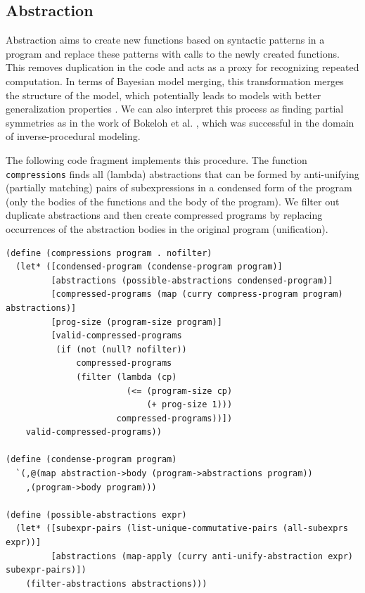 \documentclass[a4paper,10pt]{article}
\begin{document}
\subsection{Abstraction}

Abstraction aims to create new functions based on syntactic patterns in a program and replace these patterns with calls to the newly created functions.
This removes duplication in the code and acts as a proxy for recognizing repeated computation.
In terms of Bayesian model merging, this transformation merges the structure of the model, which potentially leads to models with better generalization properties \cite{Stolcke:1994:IPG:645515.658235}. We can also interpret this process as finding partial symmetries as in the work of Bokeloh et al. \cite{DBLP:journals/tog/BokelohWS10}, which was successful in the domain of inverse-procedural modeling.

The following code fragment implements this procedure. The function \texttt{compressions} finds all (lambda) abstractions that can be formed by anti-unifying (partially matching) pairs of subexpressions in a condensed form of the program (only the bodies of the functions and the body of the program). We filter out duplicate abstractions and then create compressed programs by replacing occurrences of the abstraction bodies in the original program (unification).

\begin{lstlisting}[frame=trbl]
(define (compressions program . nofilter)
  (let* ([condensed-program (condense-program program)]
         [abstractions (possible-abstractions condensed-program)]
         [compressed-programs (map (curry compress-program program) abstractions)]
         [prog-size (program-size program)]
         [valid-compressed-programs
          (if (not (null? nofilter))
              compressed-programs
              (filter (lambda (cp)
                        (<= (program-size cp)
                            (+ prog-size 1)))
                      compressed-programs))])
    valid-compressed-programs))

(define (condense-program program)
  `(,@(map abstraction->body (program->abstractions program))
    ,(program->body program)))

(define (possible-abstractions expr)
  (let* ([subexpr-pairs (list-unique-commutative-pairs (all-subexprs expr))]
         [abstractions (map-apply (curry anti-unify-abstraction expr) subexpr-pairs)])
    (filter-abstractions abstractions)))
\end{lstlisting}
\end{document}
